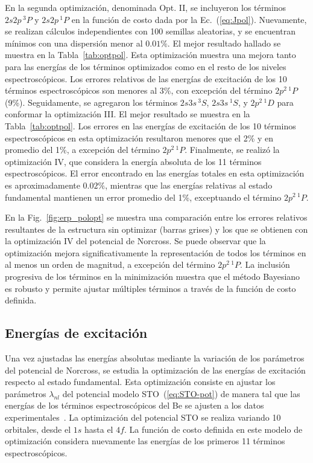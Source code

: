 En la segunda optimización, denominada Opt. II, se incluyeron los 
términos $2s2p\,^3\!P$ y $2s2p\,^1\!P$ en la función de costo dada por la 
Ec.~(\ref{eq:Jpol}). Nuevamente, se realizan cálculos independientes con 
100 semillas aleatorias, y se encuentran mínimos con una dispersión 
menor al $0.01\%$. El mejor resultado hallado se muestra en la 
Tabla~\ref{tab:optpol}. Esta optimización muestra una mejora tanto para 
las energías de los términos optimizados como en el resto de los niveles 
espectroscópicos. Los errores relativos de las energías de excitación de 
los 10 términos espectroscópicos son menores al 3\%, con excepción del 
término $2p^2\,^1\!P$ (9\%). Seguidamente, se agregaron los términos 
$2s3s\,^3\!S$, $2s3s\,^1\!S$, y $2p^2\,^1\!D$ para conformar la optimización
III. El mejor resultado se muestra en la Tabla~\ref{tab:optpol}. Los 
errores en las energías de excitación de los 10 términos 
espectroscópicos en esta optimización resultaron menores que el 2\% y en 
promedio del 1\%, a excepción del término $2p^2\,^1\!P$. Finalmente, se 
realizó la optimización IV, que considera la energía absoluta de los 11 
términos espectroscópicos. El error encontrado en las energías totales 
en esta optimización es aproximadamente $0.02\%$, mientras que las 
energías relativas al estado fundamental mantienen un error promedio del 
1\%, exceptuando el término $2p^2\,^1\!P$. 

En la Fig.~\ref{fig:erp_polopt} se muestra una comparación entre los 
errores relativos resultantes de la estructura sin optimizar (barras 
grises) y los que se obtienen con la optimización IV del potencial de 
Norcross. Se puede observar que la optimización mejora 
significativamente la representación de todos los términos en al menos
un orden de magnitud, a excepción del término $2p^2\,^1\!P$. La inclusión
progresiva de los términos en la minimización muestra que el método 
Bayesiano es robusto y permite ajustar múltiples términos a través de 
la función de costo definida.

\subsection{Energías de excitación}

Una vez ajustadas las energías absolutas mediante la variación de los 
parámetros del potencial de Norcross, se estudia la optimización de las 
energías de excitación respecto al estado fundamental. Esta optimización 
consiste en ajustar los parámetros $\lambda_{nl}$ del potencial modelo 
STO~(\ref{eq:STO-pot}) de manera tal que las energías de los términos 
espectroscópicos del Be se ajusten a los datos 
experimentales~\cite{NIST}. 
La optimización del potencial STO se realiza variando 10 orbitales, 
desde el $1s$ hasta el $4f$. La función de costo definida en este modelo 
de optimización considera nuevamente las energías de los primeros 11 
términos espectroscópicos. 

